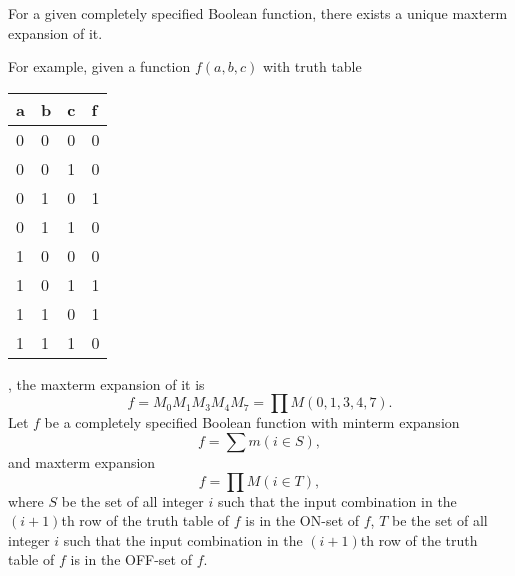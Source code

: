 \documentclass[a4paper,12pt]{article}
\begin{document}
\begin{itemize}
\begin{itemize}
\begin{itemize}
\begin{itemize}
\begin{itemize}
\begin{itemize}
\begin{itemize}
For a given completely specified Boolean function, there exists a unique maxterm expansion of it.

For example, given a function $f(a,b,c)$ with truth table
\begin{longtable}[c]{|m|m|m|m|}
\hline
a & b & c & f\\\hline
0 & 0 & 0 & 0\\\hline
0 & 0 & 1 & 0\\\hline
0 & 1 & 0 & 1\\\hline
0 & 1 & 1 & 0\\\hline
1 & 0 & 0 & 0\\\hline
1 & 0 & 1 & 1\\\hline
1 & 1 & 0 & 1\\\hline
1 & 1 & 1 & 0\\\hline
\end{longtable}
, the maxterm expansion of it is
\[f=M_0M_1M_3M_4M_7=\prod M(0,1,3,4,7).\]
Let $f$ be a completely specified Boolean function with minterm expansion
\[f=\sum m(i\in S),\]
and maxterm expansion
\[f=\prod M(i\in T),\]
where $S$ be the set of all integer $i$ such that the input combination in the $(i+1)$th row of the truth table of $f$ is in the ON-set of $f$, $T$ be the set of all integer $i$ such that the input combination in the $(i+1)$th row of the truth table of $f$ is in the OFF-set of $f$.


\end{itemize}
\end{itemize}
\end{itemize}
\end{itemize}
\end{itemize}
\end{itemize}
\end{itemize}
\end{document}
